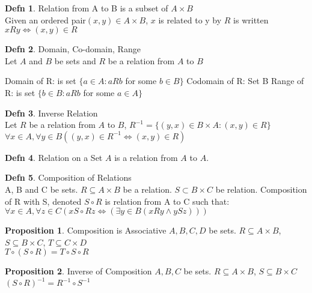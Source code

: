 \documentclass[a4paper]{article}
\theoremstyle{definition}
\newtheorem*{defn}{Defn}
\newtheorem*{propos}{Proposition}
\begin{document}
\begin{defn} Relation from A to B is a subset of $A \times B$\\
  Given an ordered pair$(x, y) \in A\times B$, $x$ is 
  related to y by $R$ is written $xRy \Leftrightarrow (x, y) \in R$
\end{defn}

\begin{defn} Domain, Co-domain, Range\\
  Let $A$ and $B$ be sets and $R$ be a relation from $A$ to $B$
  \begin{numpf*}
    \pfln Domain of R: is set $\{a \in A: aRb$ for some $b \in B\}$
    \pfln Codomain of R: Set B
    \pfln Range of R: is set $\{b \in B: aRb$ for some $a \in A\}$
  \end{numpf*}
\end{defn}

\begin{defn} Inverse Relation\\
  Let $R$ be a relation from $A$ to $B$, 
  $R^{-1} = \{(y, x) \in B\times A: (x, y) \in R\}$\\
  $\forall x \in A, \forall y \in B ((y, x) \in R^{-1} \Leftrightarrow (x, y) \in R)$
\end{defn}

\begin{defn} 
  Relation on a Set $A$ is a relation from $A$ to $A$.
\end{defn}

\begin{defn} Composition of Relations\\
  A, B and C be sets. $R \subseteq A \times B$ be a relation. $S \subset B \times C$ be relation. Composition of R with S, denoted $S \circ R$ is relation from A to C such that: \\
  $\forall x \in A, \forall z \in C(x S \circ R z \Leftrightarrow (\exists y \in B (xRy \land ySz)))$
\end{defn}

\begin{propos} Composition is Associative
  $A, B, C, D$ be sets. $R \subseteq A \times B$, $S \subseteq B \times C$, $T \subseteq C \times D$\\
  $T \circ ( S \circ R) = T \circ S \circ R$
\end{propos}

\begin{propos} Inverse of Composition
  $A, B, C$ be sets. $R \subseteq A \times B$, $S \subseteq B \times C$\\
  $(S \circ R)^{-1} = R^{-1} \circ S^{-1}$
\end{propos}
\end{document}
